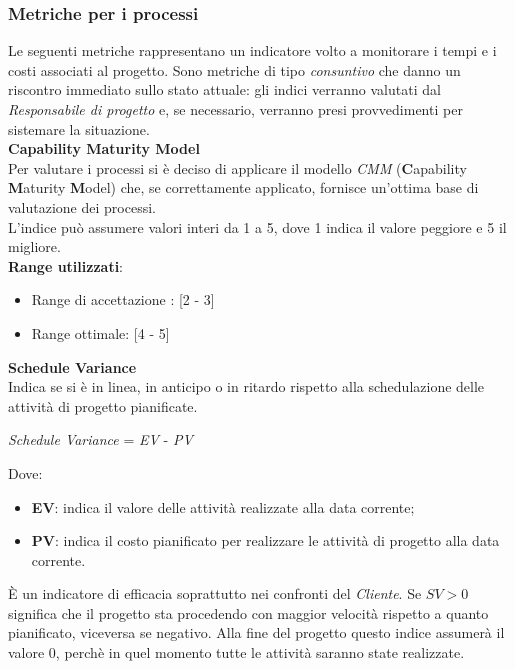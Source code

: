 \subsubsection{Metriche per i processi}
Le seguenti metriche rappresentano un indicatore volto a monitorare i tempi e i costi associati al progetto. Sono metriche di tipo \textit{consuntivo} che danno un riscontro immediato sullo stato attuale: gli indici verranno valutati dal \textit{Responsabile di progetto} e, se necessario, verranno presi provvedimenti per sistemare la situazione.\\

\textbf{Capability Maturity Model}\\

Per valutare i processi si \`e deciso di applicare il modello \textit{CMM} (\textbf{C}apability \textbf{M}aturity \textbf{M}odel) che, se correttamente applicato, fornisce un'ottima base di valutazione dei processi. \\
L'indice pu\`o assumere valori interi da 1 a 5, dove 1 indica il valore peggiore e 5 il migliore.\\

\textbf{Range utilizzati}:
\begin{itemize}
	\item Range di accettazione : [2 - 3]
	\item Range ottimale: [4 - 5]
\end{itemize}

\textbf{Schedule Variance}\\

Indica se si \`e in linea, in anticipo o in ritardo rispetto alla schedulazione delle attività di progetto
pianificate.
\begin{center}
	\textit{Schedule Variance} = \textit{EV} - \textit{PV} 
\end{center}
Dove:
\begin{itemize}
	\item \textbf{EV}: indica il valore delle attivit\`a realizzate alla data corrente;
	\item \textbf{PV}: indica il costo pianificato per realizzare le attività di progetto alla data corrente.
\end{itemize}
\`E un indicatore di efficacia soprattutto nei confronti del \textit{Cliente}. Se \begin{math}{SV > 0}\end{math} significa che il progetto sta procedendo con maggior velocit\`a rispetto a quanto pianificato, viceversa se negativo. Alla fine del progetto questo indice assumer\`a il valore 0, perch\`e in quel momento tutte le attivit\`a saranno state realizzate.\\


